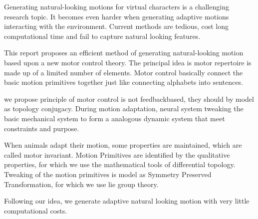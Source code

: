 


\begin{abstracts}        %

Generating natural-looking motions for virtual characters is a challenging research topic.
It becomes even harder when generating adaptive motions interacting with the environment. 
Current methods are tedious, cost long computational time and fail to capture natural looking features.

This report proposes an efficient method of generating natural-looking motion based upon a new motor control theory.
The principal idea is motor repertoire is made up of a limited number of elements. Motor control basically connect the basic motion primitives together just like connecting alphabets into sentences.

we propose principle of motor control is not feedbackbased, they should by model as topology conjugacy.
During motion adaptation, neural system tweaking the basic mechanical system to form a analogous dynamic system that meet constraints and purpose.

When animals adapt their motion, some properties are maintained, which are  called motor invariant.
Motion Primitives are identified by the qualitative properties, for which we use the mathematical tools of differential topology.
Tweaking of the motion primitives is model as Symmetry Preserved Transformation, for which we use lie group theory.



Following our idea, we generate adaptive natural looking motion with very little computational costs.
\end{abstracts}




